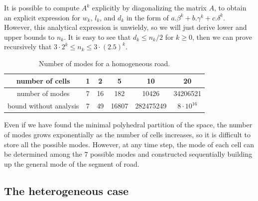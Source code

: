 It is possible to compute $A^{k}$ explicitly by diagonalizing the matrix $A$, to obtain an explicit expression for $w_{k}$, $l_{k}$, and $d_{k}$ in the form of $a.\beta^{k} + b.\gamma^{k} + c.\delta^{k}$. However, this analytical expression is unwieldy, so we will just derive lower and upper bounds to $n_{k}$. It is easy to see that $d_{k} \leq n_{k}/2$ for $k\geq 0$, then we can prove recursively that $3\cdot2^{k} \leq n_{k} \leq 3\cdot(2.5)^{k}$.

\begin{table}[ht]
\centering %
\begin{tabular}{|c|c|c|c|c|c|}
  \hline
 number of cells & 1 & 2 & 5 & 10 & 20\\
  \hline
 number of modes & 7 & 16 & 182 & 10426 & 34206521\\
  \hline
 bound without analysis & 7 & 49 & 16807 & 282475249 & $8\cdot 10^{16}$\\
  \hline
\end{tabular}
\label{table:numModes} %
\caption{Number of modes for a homogeneous road.}
\end{table}

Even if we have found the minimal polyhedral partition of the space, the number of modes grows exponentially as the number of cells increases, so it is difficult to store all the possible modes. However, at any time step, the mode of each cell can be determined among the 7 possible modes and constructed sequentially building up the general mode of the segment of road.


\subsection{The heterogeneous case}\label{sec:CDFD}

